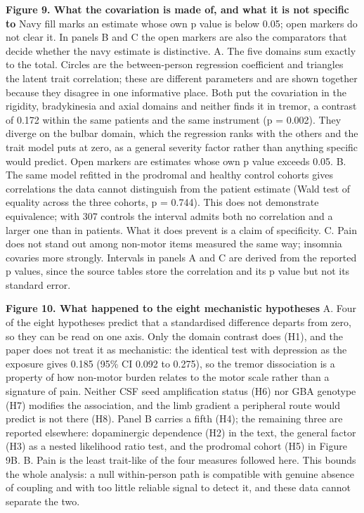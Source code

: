 \documentclass[
  english,
  12pt,
]{article}
\begin{document}
\textbf{Figure 9. What the covariation is made of, and what it is not specific to} Navy fill marks an estimate whose own p value is below 0.05; open markers do not clear it. In panels B and C the open markers are also the comparators that decide whether the navy estimate is distinctive. A. The five domains sum exactly to the total. Circles are the between-person regression coefficient and triangles the latent trait correlation; these are different parameters and are shown together because they disagree in one informative place. Both put the covariation in the rigidity, bradykinesia and axial domains and neither finds it in tremor, a contrast of 0.172 within the same patients and the same instrument (p = 0.002). They diverge on the bulbar domain, which the regression ranks with the others and the trait model puts at zero, as a general severity factor rather than anything specific would predict. Open markers are estimates whose own p value exceeds 0.05. B. The same model refitted in the prodromal and healthy control cohorts gives correlations the data cannot distinguish from the patient estimate (Wald test of equality across the three cohorts, p = 0.744). This does not demonstrate equivalence; with 307 controls the interval admits both no correlation and a larger one than in patients. What it does prevent is a claim of specificity. C. Pain does not stand out among non-motor items measured the same way; insomnia covaries more strongly. Intervals in panels A and C are derived from the reported p values, since the source tables store the correlation and its p value but not its standard error.

\textbf{Figure 10. What happened to the eight mechanistic hypotheses} A. Four of the eight hypotheses predict that a standardised difference departs from zero, so they can be read on one axis. Only the domain contrast does (H1), and the paper does not treat it as mechanistic: the identical test with depression as the exposure gives 0.185 (95\% CI 0.092 to 0.275), so the tremor dissociation is a property of how non-motor burden relates to the motor scale rather than a signature of pain. Neither CSF seed amplification status (H6) nor GBA genotype (H7) modifies the association, and the limb gradient a peripheral route would predict is not there (H8). Panel B carries a fifth (H4); the remaining three are reported elsewhere: dopaminergic dependence (H2) in the text, the general factor (H3) as a nested likelihood ratio test, and the prodromal cohort (H5) in Figure 9B. B. Pain is the least trait-like of the four measures followed here. This bounds the whole analysis: a null within-person path is compatible with genuine absence of coupling and with too little reliable signal to detect it, and these data cannot separate the two.
\end{document}
